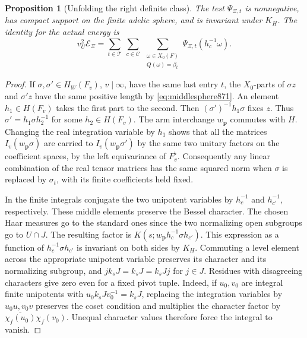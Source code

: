 \documentclass[a4paper,11pt]{article}
\newtheorem{proposition}{Proposition}[section]
\theoremstyle{definition}
\theoremstyle{remark}
\numberwithin{equation}{section}
\begin{document}
\begin{proposition}[Unfolding the right definite class]\leavevmode
\label{prop:sphereunfold872}
The test \(\Psi_{\Xi,t}\) is nonnegative, has compact support on
the finite adelic sphere, and is invariant under \(K_H\). The
identity for the actual energy is
\begin{equation}
 v_U^2\mathcal E_\Xi=
       \sum_{t\in\mathcal T}\ \sum_{c\in\mathcal C}\
       \sum_{\substack{\omega\in X_0(F)\\Q(\omega)=\beta_t}}
                       \Psi_{\Xi,t}(h_c^{-1}\omega).
 \label{eq:classsphere872}
\end{equation}
\end{proposition}
\begin{proof}
If \(\sigma,\sigma'\in H_W(F_v)\), \(v\mid\infty\), have the same
last entry \(t\), the \(X_0\)-parts of \(\sigma z\) and \(\sigma'z\)
have the same positive length by \eqref{eq:middlesphere871}.
An element \(h_1\in H(F_v)\) takes the first part to the second.
Then \((\sigma')^{-1}h_1\sigma\) fixes \(z\). Thus
\(\sigma'=h_1\sigma h_2^{-1}\) for some \(h_2\in H(F_v)\).
The arm interchange \(w_{\mathbf p}\) commutes with \(H\).
Changing the real integration variable by \(h_1\) shows that
all the matrices \(I_v(w_{\mathbf p}\sigma)\) are carried to
\(I_v(w_{\mathbf p}\sigma')\) by the same two unitary factors
on the coefficient spaces, by the left equivariance of \(F_v^\flat\).
Consequently any linear combination of the real tensor matrices
has the same squared norm when \(\sigma\) is replaced by
\(\sigma_t\), with its finite coefficients held fixed.

In the finite integrals conjugate the two unipotent variables
by \(h_c^{-1}\) and \(h_{c'}^{-1}\), respectively. These middle
elements preserve the Bessel character. The chosen Haar measures
go to the standard ones since the two normalizing open subgroups
go to \(U\cap J\). The resulting factor is
\(K(s;w_{\mathbf p}h_c^{-1}\sigma h_{c'})\). This expression as
a function of \(h_c^{-1}\sigma h_{c'}\) is invariant on both
sides by \(K_H\). Commuting a level element across the appropriate
unipotent variable preserves its character and its normalizing
subgroup, and \(j k_s J=k_sJ=k_sJj\) for \(j\in J\).
Residues with disagreeing characters give zero even for a fixed
pivot tuple. Indeed, if \(u_0,v_0\) are integral finite unipotents
with \(u_0 k_sJv_0^{-1}=k_sJ\), replacing the integration
variables by \(u_0u,v_0v\) preserves the coset condition and
multiplies the character factor by
\(\overline{\chi_f(u_0)}\chi_f(v_0)\).
Unequal character values therefore force the integral to vanish.


\end{proof}
\end{document}
